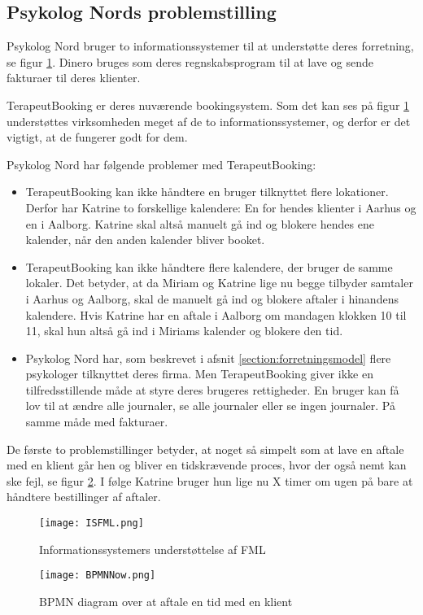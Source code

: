 \subsection{Psykolog Nords problemstilling}

Psykolog Nord bruger to informationssystemer til at understøtte deres forretning, se figur \ref{forretning:isfml}.
Dinero bruges som deres regnskabsprogram til at lave og sende fakturaer til deres klienter.

TerapeutBooking er deres nuværende bookingsystem.
Som det kan ses på figur \ref{forretning:isfml} understøttes virksomheden meget af de to informationssystemer, og derfor er det vigtigt, at de fungerer godt for dem.

Psykolog Nord har følgende problemer med TerapeutBooking:

\begin{itemize}
    \item TerapeutBooking kan ikke håndtere en bruger tilknyttet flere lokationer.
    Derfor har Katrine to forskellige kalendere: En for hendes klienter i Aarhus og en i Aalborg.
    Katrine skal altså manuelt gå ind og blokere hendes ene kalender, når den anden kalender bliver booket.
    
    \item TerapeutBooking kan ikke håndtere flere kalendere, der bruger de samme lokaler.
    Det betyder, at da Miriam og Katrine lige nu begge tilbyder samtaler i Aarhus og Aalborg, skal de manuelt gå ind og blokere aftaler i hinandens kalendere.
    Hvis Katrine har en aftale i Aalborg om mandagen klokken 10 til 11, skal hun altså gå ind i Miriams kalender og blokere den tid.
    
   \item Psykolog Nord har, som beskrevet i afsnit \ref{section:forretningsmodel} flere psykologer tilknyttet deres firma.
   Men TerapeutBooking giver ikke en tilfredsstillende måde at styre deres brugeres rettigheder.
   En bruger kan få lov til at ændre alle journaler, se alle journaler eller se ingen journaler.
   På samme måde med fakturaer.
\end{itemize}

De første to problemstillinger betyder, at noget så simpelt som at lave en aftale med en klient går hen og bliver en tidskrævende proces, hvor der også nemt kan ske fejl, se figur \ref{forretning:bpmnnow}.
I følge Katrine bruger hun lige nu X timer om ugen på bare at håndtere bestillinger af aftaler.


\begin{figure}
    \caption{Informationssystemers understøttelse af FML}
    \centering
        \texttt{[image: ISFML.png]}
    \label{forretning:isfml}
\end{figure}

\begin{figure}
    \caption{BPMN diagram over at aftale en tid med en klient}
    \centering
        \texttt{[image: BPMNNow.png]}
    \label{forretning:bpmnnow}
\end{figure}